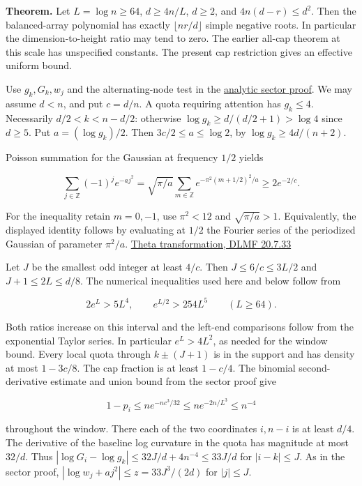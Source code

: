 \documentclass[11pt]{article}
\begin{document}
\textbf{Theorem.} Let $L=\log n\ge64$, $d\ge4n/L$, $d\ge2$, and $4n(d-r)\le d^2$. Then the balanced-array polynomial has exactly $\lfloor nr/d\rfloor$ simple negative roots. In particular the dimension-to-height ratio may tend to zero. The earlier all-cap theorem at this scale has unspecified constants. The present cap restriction gives an effective uniform bound.

Use $g_k,G_k,w_j$ and the alternating-node test in the \hyperref[sec:analytic]{analytic sector proof}. We may assume $d<n$, and put $c=d/n$. A quota requiring attention has $g_k\le4$. Necessarily $d/2<k<n-d/2$: otherwise $\log g_k\ge d/(d/2+1)>\log4$ since $d\ge5$. Put $a=(\log g_k)/2$. Then $3c/2\le a\le\log 2$, by $\log g_k\ge4d/(n+2)$.

Poisson summation for the Gaussian at frequency $1/2$ yields

\begin{equation*}
\sum_{j\in\mathbb Z}(-1)^j e^{-a j^2}
=\sqrt{\pi/a}\sum_{m\in\mathbb Z}e^{-\pi^2(m+1/2)^2/a}
\ge2e^{-2/c}.
\end{equation*}

For the inequality retain $m=0,-1$, use $\pi^2<12$ and $\sqrt{\pi/a}>1$. Equivalently, the displayed identity follows by evaluating at $1/2$ the Fourier series of the periodized Gaussian of parameter $\pi^2/a$. \href{https://dlmf.nist.gov/20.7.E33}{Theta transformation, DLMF 20.7.33}

Let $J$ be the smallest odd integer at least $4/c$. Then $J\le6/c\le3L/2$ and $J+1\le2L\le d/8$. The numerical inequalities used here and below follow from

\begin{equation*}
2e^L>5L^4, \qquad e^{L/2}>254 L^5 \qquad(L\ge64).
\end{equation*}

Both ratios increase on this interval and the left-end comparisons follow from the exponential Taylor series. In particular $e^L>4L^2$, as needed for the window bound. Every local quota through $k\pm(J+1)$ is in the support and has density at most $1-3c/8$. The cap fraction is at least $1-c/4$. The binomial second-derivative estimate and union bound from the sector proof give

\begin{equation*}
1-p_i\le n e^{-n c^3/32}\le n e^{-2n/L^3}\le n^{-4}
\end{equation*}

throughout the window. There each of the two coordinates $i,n-i$ is at least $d/4$. The derivative of the baseline log curvature in the quota has magnitude at most $32/d$. Thus $|\log G_i-\log g_k|\le32J/d+4n^{-4}\le33J/d$ for $|i-k|\le J$. As in the sector proof, $|\log w_j+a j^2|\le z=33 J^3/(2d)$ for $|j|\le J$.
\end{document}
